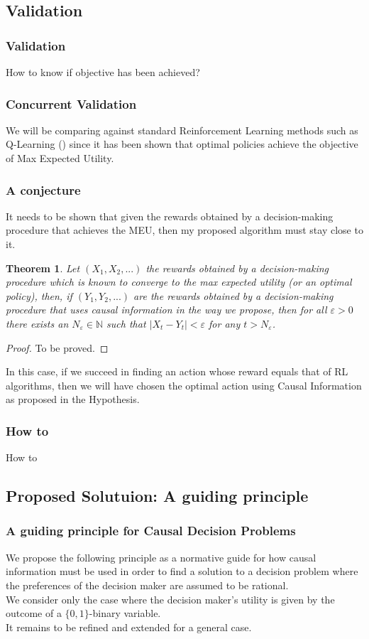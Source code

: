 \documentclass{beamer}
\theoremstyle{plain}
\newtheorem{teo}{Theorem}
\begin{document}
\subsection{Validation}
\begin{frame}
\frametitle{Validation}
How to know if objective has been achieved?
\end{frame}

\begin{frame}
\frametitle{Concurrent Validation}
We will be comparing against standard Reinforcement Learning methods such as Q-Learning (\cite{watkins1992q}) since it has been shown that optimal policies achieve the objective of Max Expected Utility.
\end{frame}

\begin{frame}
\frametitle{A conjecture}
It needs to be shown that given the rewards obtained by a decision-making procedure that achieves the MEU, then my proposed algorithm must stay close to it.
\begin{teo}
Let $(X_1,X_2,...)$ the rewards obtained by a decision-making procedure which is known to converge to the max expected utility (or an optimal policy), then, if $(Y_1, Y_2,...)$ are the rewards obtained by a decision-making procedure that uses causal information in the way we propose, then for all $\varepsilon > 0$ there exists an $N_\varepsilon \in \mathbb{N}$ such that $ | X_t - Y_t | < \varepsilon$ for any $t > N_\varepsilon$. 
\end{teo}
\begin{proof}
To be proved.
\end{proof}
\end{frame}

\begin{frame}
In this case, if we succeed in finding an action whose reward equals that of RL algorithms, then we will have chosen the optimal action using Causal Information as proposed in the Hypothesis.
\end{frame}

\begin{frame}
\frametitle{How to}
How to
\end{frame}

\subsection{Proposed Solutuion: A guiding principle}
\begin{frame}
\frametitle{A guiding principle for Causal Decision Problems}
We propose the following principle as a normative guide for how causal information must be used in order to find a solution to a decision problem where the preferences of the decision maker are assumed to be rational.\\
We consider only the case where the decision maker's utility is given by the outcome of a $\{0,1 \}$-binary variable.\\
It remains to be refined and extended for a general case. 
\end{frame}
\end{document}
